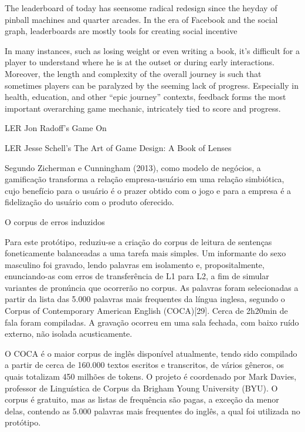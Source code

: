 The leaderboard of today has seensome radical redesign since the heyday
of pinball machines and quarter arcades. In the era of Facebook and the
social graph, leaderboards are mostly tools for creating social
incentive

In many instances, such as losing weight or even writing a book, it's
difficult for a player to understand where he is at the outset or during
early interactions. Moreover, the length and complexity of the overall
journey is such that sometimes players can be paralyzed by the seeming
lack of progress. Especially in health, education, and other ``epic
journey'' contexts, feedback forms the most important overarching game
mechanic, intricately tied to score and progress.

LER Jon Radoff's Game On

LER Jesse Schell's The Art of Game Design: A Book of Lenses

Segundo Zicherman e Cunningham (2013), como modelo de neg\'ocios, a
gamifica\c{c}\~ao transforma a rela\c{c}\~ao empresa-usu\'ario em uma rela\c{c}\~ao
simbi\'otica, cujo benef\'icio para o usu\'ario \'e o prazer obtido com o jogo e
para a empresa \'e a fideliza\c{c}\~ao do usu\'ario com o produto oferecido.

O corpus de erros induzidos

Para este prot\'otipo, reduziu-se a cria\c{c}\~ao do corpus de leitura de
senten\c{c}as foneticamente balanceadas a uma tarefa mais simples. Um
informante do sexo masculino foi gravado, lendo palavras em isolamento
e, propositalmente, enunciando-as com erros de transfer\^encia de L1 para
L2, a fim de simular variantes de pron\'uncia que ocorrer\~ao no corpus. As
palavras foram selecionadas a partir da lista das 5.000 palavras mais
frequentes da l\'ingua inglesa, segundo o Corpus of Contemporary American
English (COCA){[}29{]}. Cerca de 2h20min de fala foram compiladas. A
grava\c{c}\~ao ocorreu em uma sala fechada, com baixo ru\'ido externo, n\~ao
isolada acusticamente.

O COCA \'e o maior corpus de ingl\^es dispon\'ivel atualmente, tendo sido
compilado a partir de cerca de 160.000 textos escritos e transcritos, de
v\'arios g\^eneros, os quais totalizam 450 milh\~oes de tokens. O projeto \'e
coordenado por Mark Davies, professor de Lingu\'istica de Corpus da
Brigham Young University (BYU). O corpus \'e gratuito, mas as listas de
frequ\^encia s\~ao pagas, a exce\c{c}\~ao da menor delas, contendo as 5.000
palavras mais frequentes do ingl\^es, a qual foi utilizada no prot\'otipo.

